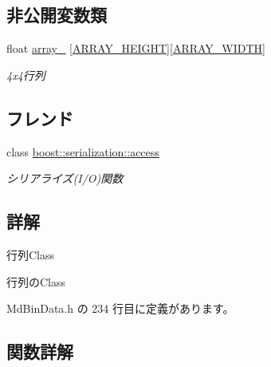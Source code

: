 \subsection*{非公開変数類}
\begin{DoxyCompactItemize}
\item 
float \mbox{\hyperlink{class_md_bin_data_1_1_matrix_a9b13d72966bb7b35e1c5acbfef92095f}{array\+\_\+}} \mbox{[}\mbox{\hyperlink{class_md_bin_data_1_1_matrix_a69ea4171a8c2fbf1728396463bfd9bc8}{A\+R\+R\+A\+Y\+\_\+\+H\+E\+I\+G\+HT}}\mbox{]}\mbox{[}\mbox{\hyperlink{class_md_bin_data_1_1_matrix_adbf2f2e21df64ab4559b9c98b88a6c59}{A\+R\+R\+A\+Y\+\_\+\+W\+I\+D\+TH}}\mbox{]}
\begin{DoxyCompactList}\small\item\em 4x4行列 \end{DoxyCompactList}\end{DoxyCompactItemize}
\subsection*{フレンド}
\begin{DoxyCompactItemize}
\item 
class \mbox{\hyperlink{class_md_bin_data_1_1_matrix_ac98d07dd8f7b70e16ccb9a01abf56b9c}{boost\+::serialization\+::access}}
\begin{DoxyCompactList}\small\item\em シリアライズ(I/O)関数 \end{DoxyCompactList}\end{DoxyCompactItemize}


\subsection{詳解}
行列\+Class 

行列の\+Class 

 Md\+Bin\+Data.\+h の 234 行目に定義があります。



\subsection{関数詳解}
\mbox{\label{class_md_bin_data_1_1_matrix_a18fdeb0e8152f5f8a8ba8e8d64c925bf}} 
